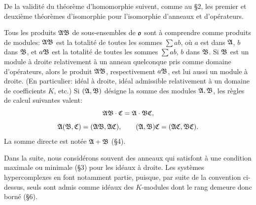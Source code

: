 De la validité du théorème d'homomorphie suivent, comme au \S{}2, les premier et deuxième théorèmes d'isomorphie pour l'isomorphie d'anneaux et d'opérateurs.

Tous les produits $\mathfrak{A}\mathfrak{B}$ de sous-ensembles de $\mathfrak{o}$ sont à comprendre comme produits de modules: $\mathfrak{A}\mathfrak{B}$ est la totalité de toutes les sommes $\sum ab$, où $a$ est dans $\mathfrak{A}$, $b$ dans $\mathfrak{B}$, et $a\mathfrak{B}$ est la totalité de toutes les sommes $\sum ab$, $b$ dans $\mathfrak{B}$. Si $\mathfrak{B}$ est un module à droite relativement à un anneau quelconque pris comme domaine d'opérateurs, alors le produit $\mathfrak{A}\mathfrak{B}$, respectivement $a\mathfrak{B}$, est lui aussi un module à droite. (En particulier: idéal à droite, idéal admissible relativement à un domaine de coefficients $K$, etc.) Si $(\mathfrak{A},\mathfrak{B})$ désigne la somme des modules $\mathfrak{A},\mathfrak{B}$, les règles de calcul suivantes valent:
\[
        \mathfrak{A}\mathfrak{B}\cdot\mathfrak{C}=\mathfrak{A}\cdot\mathfrak{B}\mathfrak{C},
\]
\[
        \mathfrak{A}(\mathfrak{B},\mathfrak{C})=(\mathfrak{A}\mathfrak{B},\mathfrak{A}\mathfrak{C}),
        \qquad
        (\mathfrak{A},\mathfrak{B})\mathfrak{C}=(\mathfrak{A}\mathfrak{C},\mathfrak{B}\mathfrak{C}).
\]
La somme directe est notée $\mathfrak{A}+\mathfrak{B}$ (\S{}4).

Dans la suite, nous considérons souvent des anneaux qui satisfont à une condition maximale ou minimale (\S{}3) pour les idéaux à droite. Les systèmes hypercomplexes en font notamment partie, puisque, par suite de la convention ci-dessus, seuls sont admis comme idéaux des $K$-modules dont le rang demeure donc borné (\S{}6).
